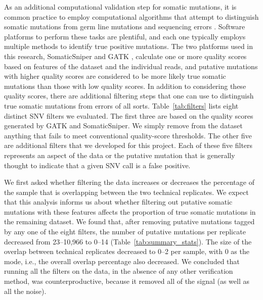 \documentclass[11pt]{article} %
\begin{document}
As an additional computational validation step for somatic mutations, it is common practice to employ computational algorithms that attempt to distinguish somatic mutations from germ line mutations and sequencing errors \citep{SomaticSniper, mut_calling}. Software platforms to perform these tasks are plentiful, and each one typically employs multiple methods to identify true positive mutations. The two platforms used in this research, SomaticSniper \citep{SomaticSniper} and GATK \citep{GATK}, calculate one or more quality scores based on features of the dataset and the individual reads, and putative mutations with higher quality scores are considered to be more likely true somatic mutations than those with low quality scores. In addition to considering these quality scores, there are additional filtering steps that one can use to distinguish true somatic mutations from errors of all sorts. Table~\ref{tab:filters} lists eight distinct SNV filters we evaluated. The first three are based on the quality scores generated by GATK and SomaticSniper.  We simply remove from the dataset anything that fails to meet conventional quality-score thresholds. The other five are additional filters that we developed for this project. Each of these five filters represents an aspect of the data or the putative mutation that is generally thought to indicate that a given SNV call is a false positive.

We first asked whether filtering the data increases or decreases the percentage of the sample that is overlapping between the two technical replicates. We expect that this analysis informs us about whether filtering out putative somatic mutations with these features affects the proportion of true somatic mutations in the remaining dataset. We found that, after removing putative mutations tagged by any one of the eight filters, the number of putative mutations per replicate decreased from 23--10,966 to 0--14 (Table~\ref{tab:summary_stats}). The size of the overlap between technical replicates decreased to 0--2 per sample, with 0 as the mode, i.e., the overall overlap percentage also decreased. We concluded that running all the filters on the data, in the absence of any other verification method, was counterproductive, because it removed all of the signal (as well as all the noise). 
\end{document}
